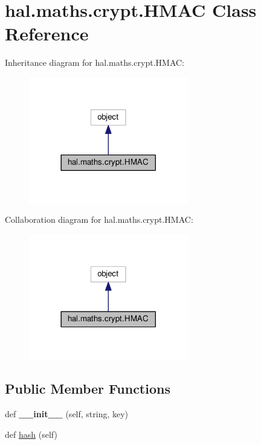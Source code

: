 \hypertarget{classhal_1_1maths_1_1crypt_1_1_h_m_a_c}{}\section{hal.\+maths.\+crypt.\+H\+M\+AC Class Reference}
\label{classhal_1_1maths_1_1crypt_1_1_h_m_a_c}


Inheritance diagram for hal.\+maths.\+crypt.\+H\+M\+AC\+:
\nopagebreak
\begin{figure}[H]
\begin{center}
\leavevmode
\includegraphics[width=197pt]{classhal_1_1maths_1_1crypt_1_1_h_m_a_c__inherit__graph}
\end{center}
\end{figure}


Collaboration diagram for hal.\+maths.\+crypt.\+H\+M\+AC\+:
\nopagebreak
\begin{figure}[H]
\begin{center}
\leavevmode
\includegraphics[width=197pt]{classhal_1_1maths_1_1crypt_1_1_h_m_a_c__coll__graph}
\end{center}
\end{figure}
\subsection*{Public Member Functions}
\begin{DoxyCompactItemize}
\item 
def {\bfseries \+\_\+\+\_\+init\+\_\+\+\_\+} (self, string, key)\hypertarget{classhal_1_1maths_1_1crypt_1_1_h_m_a_c_a0186db40c61b717b1ecc0d353272ee14}{}\label{classhal_1_1maths_1_1crypt_1_1_h_m_a_c_a0186db40c61b717b1ecc0d353272ee14}

\item 
def \hyperlink{classhal_1_1maths_1_1crypt_1_1_h_m_a_c_a6c5f1e283f7cb24eddffdda46734e71d}{hash} (self)
\end{DoxyCompactItemize}
